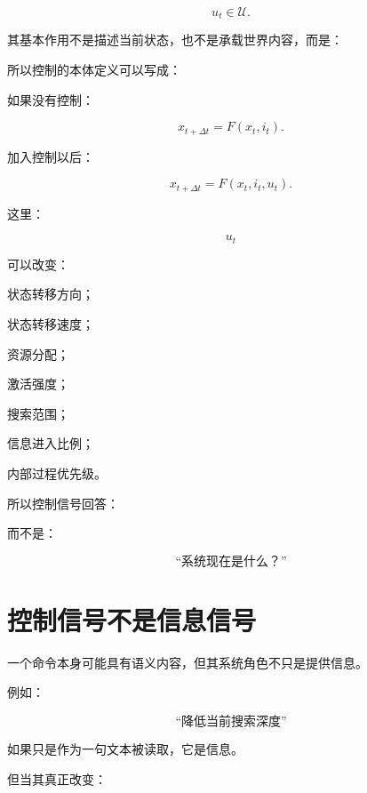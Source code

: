 \[
u_t\in\mathcal U.
\]

其基本作用不是描述当前状态，也不是承载世界内容，而是：

\begin{statementbox}
\centering
{}
\end{statementbox}

所以控制的本体定义可以写成：

\begin{statementbox}
\centering
{}
\end{statementbox}

如果没有控制：

\[
x_{t+\Delta t}
=
F(x_t,i_t).
\]

加入控制以后：

\[
\boxed{
x_{t+\Delta t}
=
F(x_t,i_t,u_t).
}
\]

这里：

\[
u_t
\]

可以改变：

状态转移方向；

状态转移速度；

资源分配；

激活强度；

搜索范围；

信息进入比例；

内部过程优先级。

所以控制信号回答：

\begin{statementbox}
\centering
{}
\end{statementbox}

而不是：

\[
\text{“系统现在是什么？”}
\]

\section{控制信号不是信息信号}

一个命令本身可能具有语义内容，但其系统角色不只是提供信息。

例如：

\[
\text{“降低当前搜索深度”}
\]

如果只是作为一句文本被读取，它是信息。

但当其真正改变：

